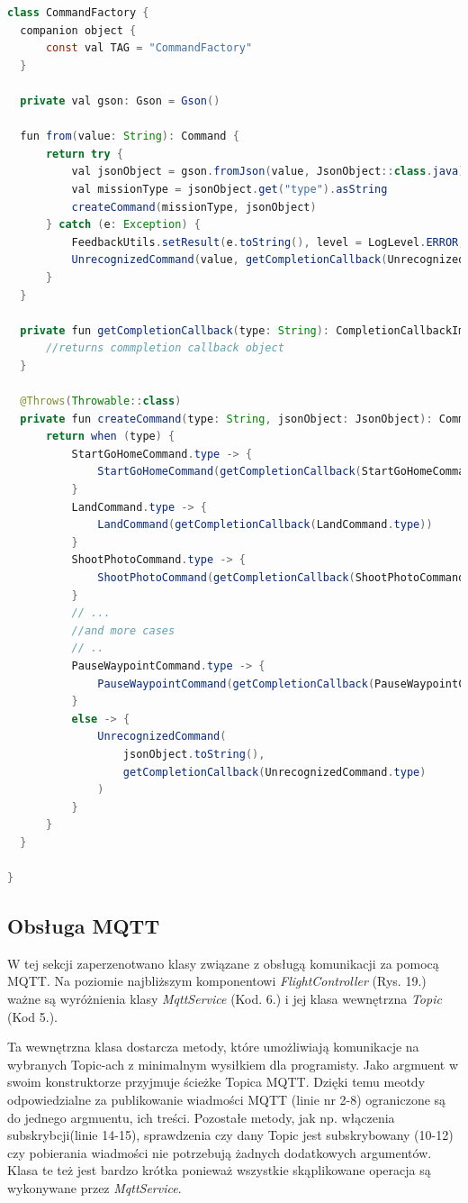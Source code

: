 \begin{lstlisting}[language=Java, caption=Klasa \textit{CommandFactory}]
class CommandFactory {
  companion object {
      const val TAG = "CommandFactory"
  }

  private val gson: Gson = Gson()

  fun from(value: String): Command {
      return try {
          val jsonObject = gson.fromJson(value, JsonObject::class.java)
          val missionType = jsonObject.get("type").asString
          createCommand(missionType, jsonObject)
      } catch (e: Exception) {
          FeedbackUtils.setResult(e.toString(), level = LogLevel.ERROR, tag = TAG)
          UnrecognizedCommand(value, getCompletionCallback(UnrecognizedCommand.type))
      }
  }

  private fun getCompletionCallback(type: String): CompletionCallbackImpl<DJIError> {
      //returns commpletion callback object
  }

  @Throws(Throwable::class)
  private fun createCommand(type: String, jsonObject: JsonObject): Command {
      return when (type) {
          StartGoHomeCommand.type -> {
              StartGoHomeCommand(getCompletionCallback(StartGoHomeCommand.type))
          }
          LandCommand.type -> {
              LandCommand(getCompletionCallback(LandCommand.type))
          }
          ShootPhotoCommand.type -> {
              ShootPhotoCommand(getCompletionCallback(ShootPhotoCommand.type))
          }
          // ...
          //and more cases
          // ..
          PauseWaypointCommand.type -> {
              PauseWaypointCommand(getCompletionCallback(PauseWaypointCommand.type))
          }
          else -> {
              UnrecognizedCommand(
                  jsonObject.toString(),
                  getCompletionCallback(UnrecognizedCommand.type)
              )
          }
      }
  }

}
\end{lstlisting}


\subsection{Obsługa MQTT}
 W tej sekcji zaperzenotwano klasy związane z obsługą komunikacji za pomocą MQTT. Na poziomie najbliższym komponentowi \textit{FlightController} (Rys. 19.) ważne są wyróżnienia klasy \textit{MqttService} (Kod. 6.) i jej klasa wewnętrzna \textit{Topic} (Kod 5.). 
 
 Ta wewnętrzna klasa dostarcza metody, które umożliwiają komunikacje na wybranych Topic-ach z minimalnym wysiłkiem dla programisty. Jako argmuent w swoim konstruktorze przyjmuje ścieżke Topica MQTT. Dzięki temu meotdy odpowiedzialne za publikowanie wiadmości MQTT (linie nr 2-8) ograniczone są do jednego argmuentu, ich treści. Pozostałe metody, jak np. włączenia subskrybcji(linie 14-15), sprawdzenia czy dany Topic jest subskrybowany (10-12) czy pobierania wiadmości nie potrzebują żadnych dodatkowych argumentów. Klasa te też jest bardzo krótka ponieważ wszystkie skąplikowane operacja są wykonywane przez \textit{MqttService}. 
 

